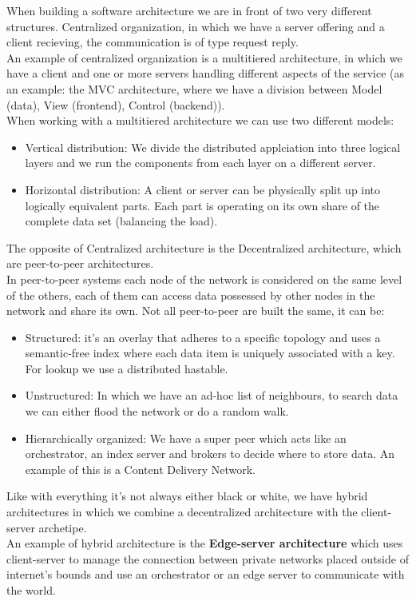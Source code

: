 When building a software architecture we are in front of two very different structures. Centralized organization, in which we have a server offering and a client recieving, the communication is of type request reply. \\
An example of centralized organization is a multitiered architecture, in which we have a client and one or more servers handling different aspects of the service (as an example: the MVC architecture, where we have a division between Model (data), View (frontend), Control (backend)). \\
When working with a multitiered architecture we can use two different models:
\begin{itemize}
    \item Vertical distribution: We divide the distributed applciation into three logical layers and we run the components from each layer on a different server.
    \item Horizontal distribution: A client or server can be physically split up into logically equivalent parts. Each part is operating on its own share of the complete data set (balancing the load).
\end{itemize}
The opposite of Centralized architecture is the Decentralized architecture, which are peer-to-peer architectures. \\
In peer-to-peer systems each node of the network is considered on the same level of the others, each of them can access data possessed by other nodes in the network and share its own. Not all peer-to-peer are built the same, it can be:
\begin{itemize}
    \item Structured: it's an overlay that adheres to a specific topology and uses a semantic-free index where each data item is uniquely associated with a key. For lookup we use a distributed hastable.
    \item Unstructured: In which we have an ad-hoc list of neighbours, to search data we can either flood the network or do a random walk.
    \item Hierarchically organized: We have a super peer which acts like an orchestrator, an index server and brokers to decide where to store data. An example of this is a Content Delivery Network.
\end{itemize}
Like with everything it's not always either black or white, we have hybrid architectures in which we combine a decentralized architecture with the client-server archetipe. \\
An example of hybrid architecture is the \textbf{Edge-server architecture} which uses client-server to manage the connection between private networks placed outside of internet's bounds and use an orchestrator or an edge server to communicate with the world. \\
